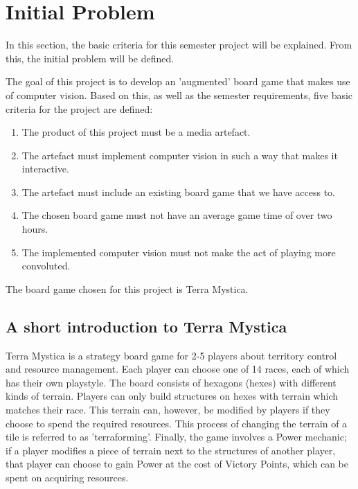 \chapter{Initial Problem}\label{ch:iniprob}
In this section, the basic criteria for this semester project will be explained. From this, the initial problem will be defined.

The goal of this project is to develop an 'augmented' board game that makes use of computer vision. Based on this, as well as the semester requirements, five basic criteria for the project are defined:

\begin{enumerate}
	\item The product of this project must be a media artefact.
	\item The artefact must implement computer vision in such a way that makes it interactive.
	\item The artefact must include an existing board game that we have access to.
	 \item The chosen board game must not have an average game time of over two hours.
	\item The implemented computer vision must not make the act of playing more convoluted.
\end{enumerate}

The board game chosen for this project is Terra Mystica.

\section{A short introduction to Terra Mystica} 
Terra Mystica is a strategy board game for 2-5 players about territory control and resource management. Each player can choose one of 14 races, each of which has their own playstyle. The board consists of hexagons (hexes) with different kinds of terrain. Players can only build structures on hexes with terrain which matches their race. This terrain can, however, be modified by players if they choose to spend the required resources. This process of changing the terrain of a tile is referred to as 'terraforming'. Finally, the game involves a Power mechanic; if a player modifies a piece of terrain next to the structures of another player, that player can choose to gain Power at the cost of Victory Points, which can be spent on acquiring resources.  

